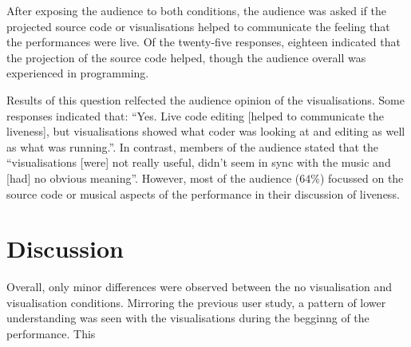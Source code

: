 After exposing the audience to both conditions, the audience was asked if the projected source code or visualisations helped to communicate the feeling that the performances were live. Of the twenty-five responses, eighteen indicated that the projection of the source code helped, though the audience overall was experienced in programming. 

Results of this question relfected the audience opinion of the visualisations. Some responses indicated that: ``Yes. Live code editing [helped to communicate the liveness], but visualisations showed what coder was looking at and editing as well as what was running.''. In contrast, members of the audience stated that the ``visualisations [were] not really useful, didn't seem in sync with the music and [had] no obvious meaning''. However, most of the audience ($64\%$) focussed on the source code or musical aspects of the performance in their discussion of liveness.

\section{Discussion}

Overall, only minor differences were observed between the no visualisation and visualisation conditions. Mirroring the previous user study, a pattern of lower understanding was seen with the visualisations during the begginng of the performance. This 








